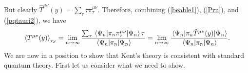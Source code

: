 But clearly $\hat{T}^{\mu\nu}(y)=\sum_\tau \tau \pi_\tau^{\mu\nu}.$ Therefore, combining (\ref{beable1}), (\ref{Prn}), and (\ref{pqtauri2}), we have 
\begin{equation}\label{kentconsistency0}
\ev*{T^{\mu\nu}(y)}_{\tau_S}=\lim_{n\rightarrow\infty}\frac{\sum_\tau \ev*{\pi_n\pi_\tau^{\mu\nu}}{\Psi_n}\tau}{\ev*{\pi_n}{\Psi_n}}=\lim_{n\rightarrow\infty}\frac{\ev*{\pi_n\hat{T}^{\mu\nu}(y)}{\Psi_n}}{\ev*{\pi_n}{\Psi_n}}.
\end{equation}We are now in a position to show that Kent's theory is consistent with standard quantum theory. First let us consider what we need to show. 

